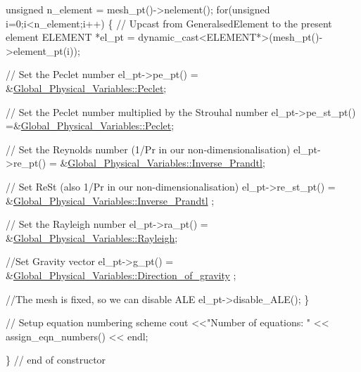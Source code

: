 \begin{DoxyCodeInclude}
 \textcolor{keywordtype}{unsigned} n\_element = mesh\_pt()->nelement();
 \textcolor{keywordflow}{for}(\textcolor{keywordtype}{unsigned} i=0;i<n\_element;i++)
  \{
   \textcolor{comment}{// Upcast from GeneralsedElement to the present element}
   ELEMENT *el\_pt = \textcolor{keyword}{dynamic\_cast<}ELEMENT*\textcolor{keyword}{>}(mesh\_pt()->element\_pt(i));

   \textcolor{comment}{// Set the Peclet number}
   el\_pt->pe\_pt() = &\hyperlink{namespaceGlobal__Physical__Variables_ad4cdf142ba50635d62ac4c614f445af7}{Global\_Physical\_Variables::Peclet};

   \textcolor{comment}{// Set the Peclet number multiplied by the Strouhal number}
   el\_pt->pe\_st\_pt() =&\hyperlink{namespaceGlobal__Physical__Variables_ad4cdf142ba50635d62ac4c614f445af7}{Global\_Physical\_Variables::Peclet};

   \textcolor{comment}{// Set the Reynolds number (1/Pr in our non-dimensionalisation)}
   el\_pt->re\_pt() = &\hyperlink{namespaceGlobal__Physical__Variables_a87796c9f402e6f90c07cf5ba0db4367e}{Global\_Physical\_Variables::Inverse\_Prandtl};

   \textcolor{comment}{// Set ReSt (also 1/Pr in our non-dimensionalisation)}
   el\_pt->re\_st\_pt() = &\hyperlink{namespaceGlobal__Physical__Variables_a87796c9f402e6f90c07cf5ba0db4367e}{Global\_Physical\_Variables::Inverse\_Prandtl}
      ;

   \textcolor{comment}{// Set the Rayleigh number}
   el\_pt->ra\_pt() = &\hyperlink{namespaceGlobal__Physical__Variables_a637fd2a6a7c5b34ed3288300d8bf84b7}{Global\_Physical\_Variables::Rayleigh};

   \textcolor{comment}{//Set Gravity vector}
   el\_pt->g\_pt() = &\hyperlink{namespaceGlobal__Physical__Variables_a42f4a0aee37dbb36186267931c614053}{Global\_Physical\_Variables::Direction\_of\_gravity}
      ;

   \textcolor{comment}{//The mesh is fixed, so we can disable ALE}
   el\_pt->disable\_ALE();
  \}

 \textcolor{comment}{// Setup equation numbering scheme}
 cout <<\textcolor{stringliteral}{"Number of equations: "} << assign\_eqn\_numbers() << endl; 

\} \textcolor{comment}{// end of constructor}

\end{DoxyCodeInclude}




